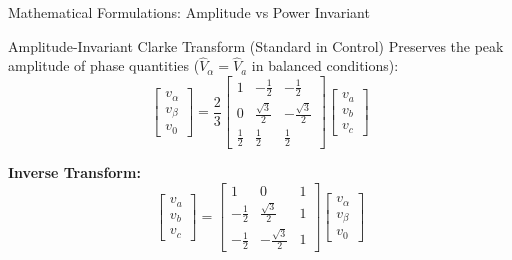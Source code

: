 \begin{frame}[allowframebreaks]{Mathematical Formulations: Amplitude vs Power Invariant}
    \begin{block}{Amplitude-Invariant Clarke Transform (Standard in Control)}
        Preserves the peak amplitude of phase quantities ($\hat{V}_\alpha = \hat{V}_a$ in balanced conditions):
        \begin{equation}
            \begin{bmatrix} v_\alpha \\ v_\beta \\ v_0 \end{bmatrix}
            =
            \frac{2}{3}
            \begin{bmatrix}
                1 & -\frac{1}{2} & -\frac{1}{2} \\
                0 & \frac{\sqrt{3}}{2} & -\frac{\sqrt{3}}{2} \\
                \frac{1}{2} & \frac{1}{2} & \frac{1}{2}
            \end{bmatrix}
            \begin{bmatrix} v_a \\ v_b \\ v_c \end{bmatrix}
        \end{equation}

        \textbf{Inverse Transform:}
        \begin{equation}
            \begin{bmatrix} v_a \\ v_b \\ v_c \end{bmatrix}
            =
            \begin{bmatrix}
                1 & 0 & 1 \\
                -\frac{1}{2} & \frac{\sqrt{3}}{2} & 1 \\
                -\frac{1}{2} & -\frac{\sqrt{3}}{2} & 1
            \end{bmatrix}
            \begin{bmatrix} v_\alpha \\ v_\beta \\ v_0 \end{bmatrix}
        \end{equation}
    \end{block}


\end{frame}

